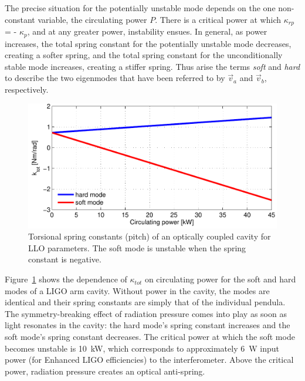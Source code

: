 The precise situation for the potentially unstable mode depends on the
one non-constant variable, the circulating power $P$. There is a
critical power at which $\kappa_{rp}$ = - $\kappa_p$, and at any
greater power, instability ensues. In general, as power increases, the
total spring constant for the potentially unstable mode decreases,
creating a softer spring, and the total spring constant for the
unconditionally stable mode increases, creating a stiffer spring. Thus
arise the terms \emph{soft} and \emph{hard} to describe the two
eigenmodes that have been referred to by $\vec{v}_a$ and $\vec{v}_b$,
respectively.

\begin{figure}
\begin{centering}
\includegraphics[width=1.0\textwidth]{figures/khardsoftLLO.pdf}
\caption[Torsional spring constants of an optically coupled
  cavity]{Torsional spring constants (pitch) of an optically coupled
  cavity for LLO parameters. The soft mode is unstable when the spring
  constant is negative.}
\label{fig:k_hardsoft}
\end{centering}
\end{figure}

Figure~\ref{fig:k_hardsoft} shows the dependence of $\kappa_{tot}$ on
circulating power for the soft and hard modes of a LIGO arm
cavity. Without power in the cavity, the modes are identical and their
spring constants are simply that of the individual pendula. The
symmetry-breaking effect of radiation pressure comes into play as soon
as light resonates in the cavity: the hard mode's spring constant
increases and the soft mode's spring constant decreases. The critical
power at which the soft mode becomes unstable is 10~kW, which
corresponds to approximately 6~W input power (for Enhanced LIGO
efficiencies) to the interferometer. Above the critical power,
radiation pressure creates an optical anti-spring. 

